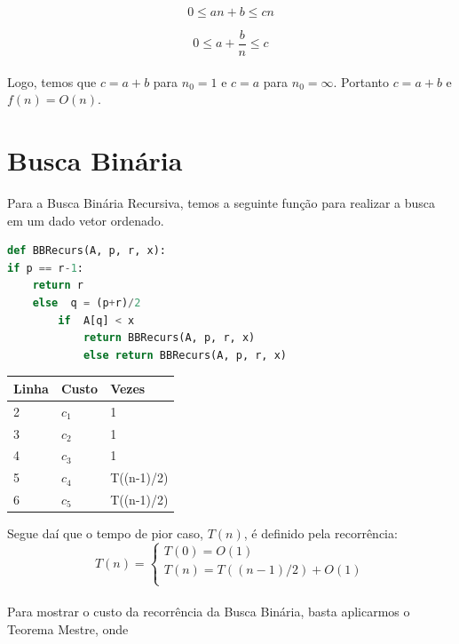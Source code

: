 \documentclass[a4paper, 12pt]{article}
\begin{document}
\begin{equation}
0 \leq an+b \leq cn
\end{equation}

\begin{equation}
0 \leq a+\frac{b}{n} \leq c
\end{equation}\\	

Logo, temos que $c=a+b$ para $n_0=1$ e $c=a$ para $n_0=\infty$. Portanto $c=a+b$ e $f(n) = O(n)$.

\section{Busca Binária}

Para a Busca Binária Recursiva, temos a seguinte função para realizar a busca em um dado vetor ordenado.

\begin{lstlisting}[language=Python, caption= Código da função da Busca Binária]
def BBRecurs(A, p, r, x):
if p == r-1:
	return r
	else  q = (p+r)/2
		if  A[q] < x
			return BBRecurs(A, p, r, x)
			else return BBRecurs(A, p, r, x)

\end{lstlisting}

\begin{center}
\begin{tabular}{|l|l|l|}
\hline
{\bf Linha} & {\bf Custo} & {\bf Vezes}\\
\hline
2 & $c_1$ & 1\\
\hline
3 & $c_2$ & 1\\
\hline
4 & $c_3$ & 1\\
\hline
5 & $c_4$ & T((n-1)/2)\\
\hline
6 & $c_5$ & T((n-1)/2)\\
\hline
\end{tabular}
\end{center}

Segue daí que o tempo de pior caso, $T(n)$, é definido pela recorrência:
\begin{equation}
T(n) = \left\{ \begin{array}{l}
T(0)=O(1) \\
T(n)=T((n-1)/2)+O(1)\\
\end{array}
\right.
\end{equation} \\

Para mostrar o custo da recorrência da Busca Binária, basta aplicarmos o Teorema Mestre, onde
\end{document}
